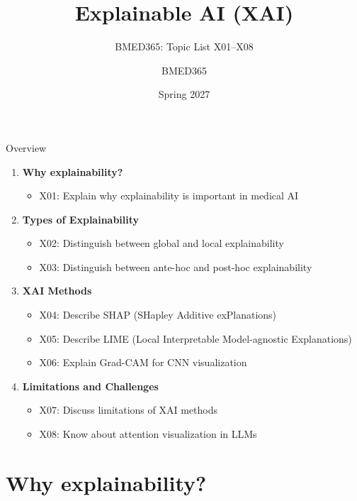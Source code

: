\documentclass[aspectratio=169, 10pt]{beamer}
\title{Explainable AI (XAI)}
\subtitle{BMED365: Topic List X01--X08}
\author{BMED365}
\date{Spring 2027}
\begin{document}
\begin{frame}
    \titlepage
\end{frame}

\begin{frame}{Overview}
    \begin{enumerate}
        \item \textbf{Why explainability?}
        \begin{itemize}
            \item X01: Explain why explainability is important in medical AI
        \end{itemize}
        \item \textbf{Types of Explainability}
        \begin{itemize}
            \item X02: Distinguish between global and local explainability
            \item X03: Distinguish between ante-hoc and post-hoc explainability
        \end{itemize}
        \item \textbf{XAI Methods}
        \begin{itemize}
            \item X04: Describe SHAP (SHapley Additive exPlanations)
            \item X05: Describe LIME (Local Interpretable Model-agnostic Explanations)
            \item X06: Explain Grad-CAM for CNN visualization
        \end{itemize}
        \item \textbf{Limitations and Challenges}
        \begin{itemize}
            \item X07: Discuss limitations of XAI methods
            \item X08: Know about attention visualization in LLMs
        \end{itemize}
    \end{enumerate}
\end{frame}

\section{Why explainability?}
\end{document}
